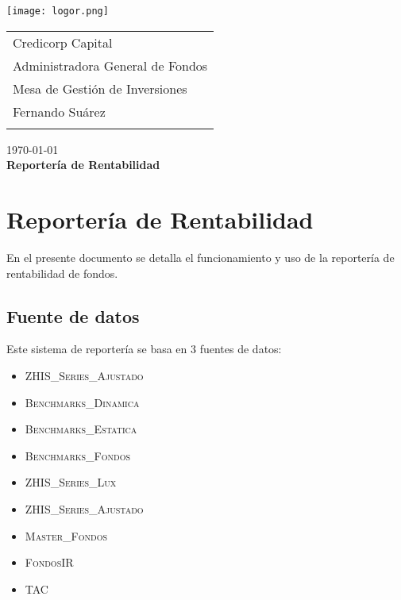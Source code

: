 \documentclass{article}
\begin{document}
\texttt{[image: logor.png]}
\vspace*{-1.55cm}

\hspace*{1.4 cm}
 \hspace*{2.9 cm}
 {\footnotesize
 \begin{tabular}{l}
  \sc Credicorp Capital\\
  \sc Administradora General de Fondos \\
  \sc Mesa de Gestión de Inversiones  \\
  \sc Fernando Suárez  \\
  \vspace{15\baselineskip}\mbox{}
  \vspace{-3mm}\mbox{}
 \end{tabular}
}

 \bigskip

\vspace*{5mm}
\begin{center}
{\today} \\
\vspace{3mm}
{\Large\bf Reportería de Rentabilidad} \\
\vspace{2mm}
\end{center}
\section{Reportería de Rentabilidad}


En el presente documento se detalla el funcionamiento y uso de la reportería de rentabilidad de fondos.


\subsection{Fuente de datos}

Este sistema de reportería se basa en 3 fuentes de datos:
\begin{itemize}
\item \textsc{ZHIS\_Series\_Ajustado}
\item \textsc{Benchmarks\_Dinamica}
\item \textsc{Benchmarks\_Estatica}
\item \textsc{Benchmarks\_Fondos}
\item \textsc{ZHIS\_Series\_Lux}
\item \textsc{ZHIS\_Series\_Ajustado}
\item \textsc{Master\_Fondos}
\item \textsc{FondosIR}
\item \textsc{TAC}
\end{itemize}
\end{document}
